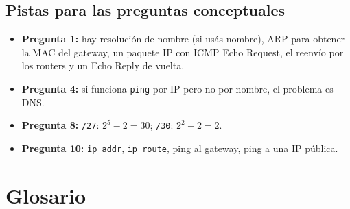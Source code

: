 \documentclass[11pt,a4paper]{article}
\theoremstyle{definition}
\theoremstyle{remark}
\newcommand{\cmd}[1]{\texttt{#1}}
\begin{document}
\subsection{Pistas para las preguntas conceptuales}

\begin{itemize}
  \item \textbf{Pregunta 1:} hay resolución de nombre (si usás nombre), ARP para obtener la MAC del gateway, un paquete IP con ICMP Echo Request, el reenvío por los routers y un Echo Reply de vuelta.
  \item \textbf{Pregunta 4:} si funciona \cmd{ping} por IP pero no por nombre, el problema es DNS.
  \item \textbf{Pregunta 8:} \texttt{/27}: $2^5-2=30$; \texttt{/30}: $2^2-2=2$.
  \item \textbf{Pregunta 10:} \cmd{ip addr}, \cmd{ip route}, ping al gateway, ping a una IP pública.
\end{itemize}

\appendix
\section{Glosario}
\end{document}
